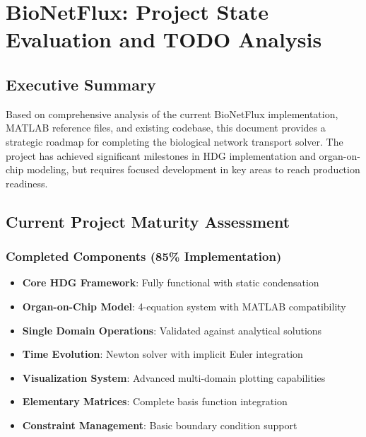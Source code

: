 %

\section{BioNetFlux: Project State Evaluation and TODO Analysis}

\subsection{Executive Summary}

Based on comprehensive analysis of the current BioNetFlux implementation, MATLAB reference files, and existing codebase, this document provides a strategic roadmap for completing the biological network transport solver. The project has achieved significant milestones in HDG implementation and organ-on-chip modeling, but requires focused development in key areas to reach production readiness.

\subsection{Current Project Maturity Assessment}

\subsubsection{Completed Components (85\% Implementation)}
\begin{itemize}
    \item \textbf{Core HDG Framework}: Fully functional with static condensation
    \item \textbf{Organ-on-Chip Model}: 4-equation system with MATLAB compatibility
    \item \textbf{Single Domain Operations}: Validated against analytical solutions
    \item \textbf{Time Evolution}: Newton solver with implicit Euler integration
    \item \textbf{Visualization System}: Advanced multi-domain plotting capabilities
    \item \textbf{Elementary Matrices}: Complete basis function integration
    \item \textbf{Constraint Management}: Basic boundary condition support
\end{itemize}

